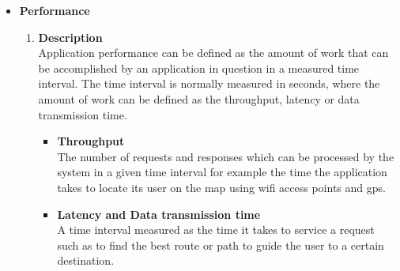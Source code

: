 \documentclass{article}
\begin{document}
		\begin{itemize}
			\item \textbf {Performance}
			\begin{enumerate}
				\item \textbf{Description} \\
				Application performance can be defined as the amount of work that can be accomplished by an application in question in a measured time interval. The time interval is normally measured in seconds, where the amount of work can be defined as the throughput, latency or data transmission time.
				\begin{itemize}
					\item \textbf{Throughput} \\
					The number of requests and responses which can be processed by the system in a given time interval for example the time the application takes to locate its user on the map using wifi access points and gps.
					\item \textbf{Latency and Data transmission time} \\
					A time interval measured as the time it takes to service a request such as to find the best route or path to guide the user to a certain destination. 
				\end{itemize}
	

\end{enumerate}
\end{itemize}
\end{document}

